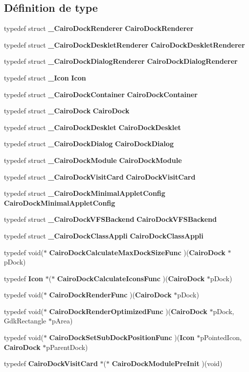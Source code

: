 \subsection*{Définition de type}
\begin{CompactItemize}
\item 
typedef struct {\bf \_\-CairoDockRenderer} {\bf CairoDockRenderer}
\item 
typedef struct {\bf \_\-CairoDockDeskletRenderer} {\bf CairoDockDeskletRenderer}
\item 
typedef struct {\bf \_\-CairoDockDialogRenderer} {\bf CairoDockDialogRenderer}
\item 
typedef struct {\bf \_\-Icon} {\bf Icon}
\item 
typedef struct {\bf \_\-CairoDockContainer} {\bf CairoDockContainer}
\item 
typedef struct {\bf \_\-CairoDock} {\bf CairoDock}
\item 
typedef struct {\bf \_\-CairoDockDesklet} {\bf CairoDockDesklet}
\item 
typedef struct {\bf \_\-CairoDockDialog} {\bf CairoDockDialog}
\item 
typedef struct {\bf \_\-CairoDockModule} {\bf CairoDockModule}
\item 
typedef struct {\bf \_\-CairoDockVisitCard} {\bf CairoDockVisitCard}
\item 
typedef struct {\bf \_\-CairoDockMinimalAppletConfig} {\bf CairoDockMinimalAppletConfig}
\item 
typedef struct {\bf \_\-CairoDockVFSBackend} {\bf CairoDockVFSBackend}
\item 
typedef struct {\bf \_\-CairoDockClassAppli} {\bf CairoDockClassAppli}
\item 
typedef void($\ast$ {\bf CairoDockCalculateMaxDockSizeFunc} )({\bf CairoDock} $\ast$pDock)
\item 
typedef {\bf Icon} $\ast$($\ast$ {\bf CairoDockCalculateIconsFunc} )({\bf CairoDock} $\ast$pDock)
\item 
typedef void($\ast$ {\bf CairoDockRenderFunc} )({\bf CairoDock} $\ast$pDock)
\item 
typedef void($\ast$ {\bf CairoDockRenderOptimizedFunc} )({\bf CairoDock} $\ast$pDock, GdkRectangle $\ast$pArea)
\item 
typedef void($\ast$ {\bf CairoDockSetSubDockPositionFunc} )({\bf Icon} $\ast$pPointedIcon, {\bf CairoDock} $\ast$pParentDock)
\item 
typedef {\bf CairoDockVisitCard} $\ast$($\ast$ {\bf CairoDockModulePreInit} )(void)

\end{CompactItemize}

